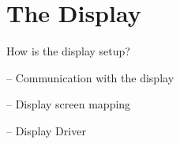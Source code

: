 \section{The Display}
How is the display setup?

-- Communication with the display

-- Display screen mapping

-- Display Driver